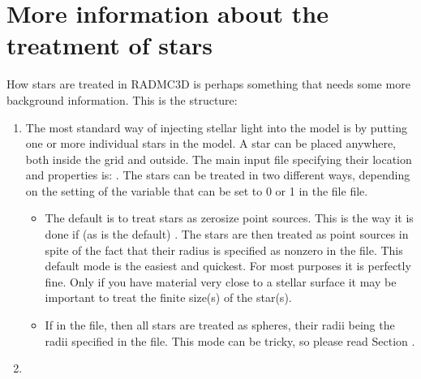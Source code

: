 \documentclass[letterpaper,10pt,english]{sphinxmanual}
\begin{document}
\chapter{More information about the treatment of stars}
\label{\detokenize{stars:more-information-about-the-treatment-of-stars}}\label{\detokenize{stars:chap-stars}}\label{\detokenize{stars::doc}}
How stars are treated in RADMC\sphinxhyphen{}3D is perhaps something that needs some more
background information. This is the structure:
\begin{enumerate}
%
\item {} 

The most standard way of injecting stellar light into the model is by putting
one or more individual stars in the model. A star can be placed anywhere,
both inside the grid and outside. The main input file specifying their
location and properties is: . The stars can be treated in two
different ways, depending on the setting of the variable 
that can be set to 0 or 1 in the file  file.
\begin{itemize}
\item {} 
The default is to treat stars as zero\sphinxhyphen{}size point sources. This is the way
it is done if (as is the default) .  The stars are then
treated as point sources in spite of the fact that their radius is
specified as non\sphinxhyphen{}zero in the  file.  This default mode is the
easiest and quickest. For most purposes it is perfectly fine. Only if you
have material very close to a stellar surface it may be important to treat
the finite size(s) of the star(s).

\item {} 
If  in the  file, then all stars are
treated as spheres, their radii being the radii specified in the
 file. This mode can be tricky, so please read Section
{\hyperref[\detokenize{stars:sec-stars-as-spheres}]{}}.

\end{itemize}

\item {} 


\end{enumerate}
\end{document}
